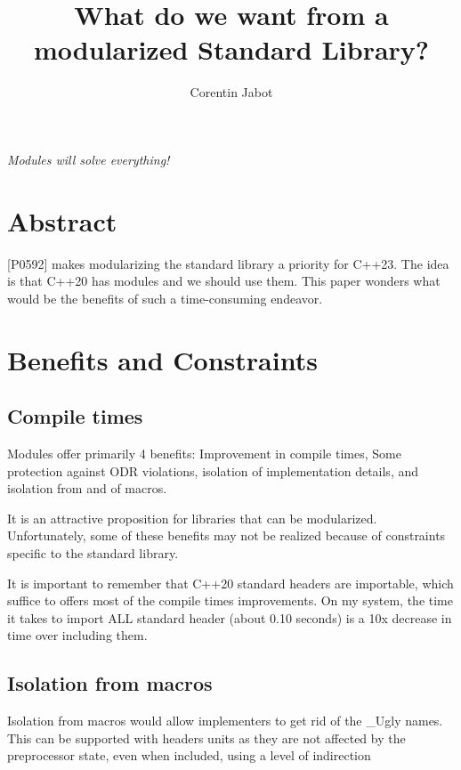 \documentclass{wg21}
\title{What do we want from a modularized Standard Library?}
\author{Corentin Jabot}{corentin.jabot@gmail.com}
\begin{document}
\maketitle

\begin{flushright}
    \hfill \break
    \hfill \break
    \textit{Modules will solve everything!}
\end{flushright}



\section{Abstract}

[P0592]\cite{P0592R4} makes modularizing the standard library a priority for C++23.
The idea is that C++20 has modules and we should use them.
This paper wonders what would be the benefits of such a time-consuming endeavor.

\section{Benefits and Constraints}

\subsection{Compile times}
Modules offer primarily 4 benefits: Improvement in compile times, Some protection against ODR violations, isolation of implementation details, and isolation from and of macros.

It is an attractive proposition for libraries that can be modularized.
Unfortunately, some of these benefits may not be realized because of constraints specific to the standard library.

It is important to remember that C++20 standard headers are importable, which suffice to offers most of the compile times improvements.
On my system, the time it takes to import ALL standard header (about 0.10 seconds) is a 10x decrease in time over including them.

\subsection{Isolation from macros}

Isolation from macros would allow implementers to get rid of the _Ugly names.
This can be supported with headers units as they are not affected by the preprocessor state,
even when included, using a level of indirection
\end{document}
